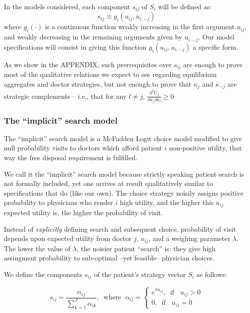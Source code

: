 \documentclass[../main.tex]{subfiles}
\begin{document}
In the models considered, each component $s_{ij}$ of $S_i$ will be defined as:
\[s_{ij} \equiv g_i(u_{ij}, u_{i,-j})\]
where $g_i(\cdot)$ is a continuous function weakly increasing in the first argument $u_{ij}$, and weakly decreasing in the remaining arguments given by $u_{i,-j}$. Our model specifications will consist in giving this function $g_i(u_{ij}, u_{i,-j})$ a specific form.

As we show in the APPENDIX, such prerrequisites over $s_{ij}$ are enough to prove most of the qualitative relations we expect to see regarding equilibrium aggregates and doctor strategies, but not enough to prove that $\bar{\kappa_j}$ and $\bar{\kappa}_{-j}$ are strategic complements -- i.e., that for any $l \neq j$, $\frac{\partial^2 U_{j}}{\partial\bar{\kappa_{j}} \partial\bar{\kappa_{l}}} \geq 0$

\subsubsection{The ``implicit'' search model}

The ``implicit'' search model is a McFadden Logit choice model modified to give null probability visits to doctors which afford patient $i$ non-positive utility, that way the free disposal requirement is fulfilled.

We call it the ``implicit'' search model because strictly speaking patient search is not formally included, yet one arrives at result qualitatively similar to specifications that do (like our own). The choice strategy noisily assigns positive probability to physicians who render $i$ high utility, and the higher this $u_{ij}$ expected utility is, the higher the probability of visit.

Instead of \textit{explicitly} defining search and subsequent choice, probability of visit depends upon expected utility from doctor $j$, $u_{ij}$, and a weighing parameter $\lambda$. The lower the value of $\lambda$, the noisier patient ``search'' is: they give high assingment probability to sub-optimal --yet feasible-- physician choices.

We define the components $s_{ij}$ of the patient's strategy vector $S_i$ as follows:

\begin{equation}
s_{ij} = \frac{\alpha_{ij}}{\sum_{k = 1}^{J} \alpha_{ik}}, \; \; \text{where } \; \alpha_{ij} = \begin{cases}
e^{\lambda u_{ij}}, \; \; \text{if } \; \; u_{ij} > 0 \\
0 , \; \; \text{if } \; \; u_{ij} = 0
\end{cases}
\label{eq:is_s}
\tag{S}
\end{equation}
\end{document}
